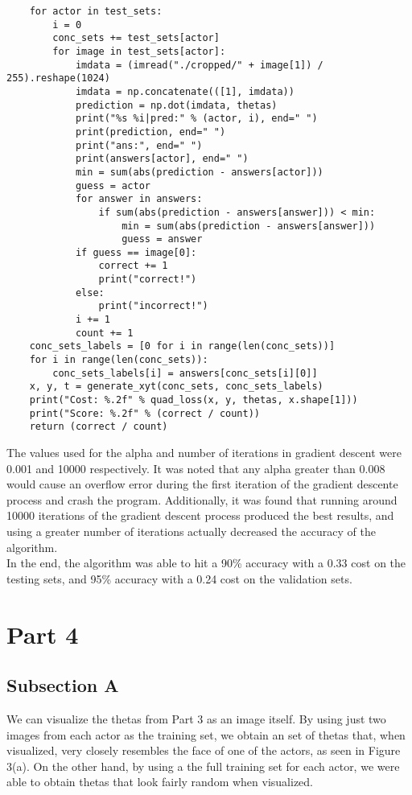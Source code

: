\documentclass[11pt,a4paper]{report}
\begin{document}
\begin{enumerate}
\begin{lstlisting}
    for actor in test_sets:
        i = 0
        conc_sets += test_sets[actor]
        for image in test_sets[actor]:
            imdata = (imread("./cropped/" + image[1]) / 255).reshape(1024)
            imdata = np.concatenate(([1], imdata))
            prediction = np.dot(imdata, thetas)
            print("%s %i|pred:" % (actor, i), end=" ")
            print(prediction, end=" ")
            print("ans:", end=" ")
            print(answers[actor], end=" ")
            min = sum(abs(prediction - answers[actor]))
            guess = actor
            for answer in answers:
                if sum(abs(prediction - answers[answer])) < min:
                    min = sum(abs(prediction - answers[answer]))
                    guess = answer
            if guess == image[0]:
                correct += 1
                print("correct!")
            else:
                print("incorrect!")
            i += 1
            count += 1
    conc_sets_labels = [0 for i in range(len(conc_sets))]
    for i in range(len(conc_sets)):
        conc_sets_labels[i] = answers[conc_sets[i][0]]
    x, y, t = generate_xyt(conc_sets, conc_sets_labels)
    print("Cost: %.2f" % quad_loss(x, y, thetas, x.shape[1]))
    print("Score: %.2f" % (correct / count))
    return (correct / count)
\end{lstlisting}
\end{enumerate}

The values used for the alpha and number of iterations in gradient descent were 0.001 and 10000 respectively. It was noted that any alpha greater than 0.008 would cause an overflow error during the first iteration of the gradient descente process and crash the program. Additionally, it was found that running around 10000 iterations of the gradient descent process produced the best results, and using a greater number of iterations actually decreased the accuracy of the algorithm.\\

In the end, the algorithm was able to hit a 90\% accuracy with a 0.33 cost on the testing sets, and 95\% accuracy with a 0.24 cost on the validation sets.

\section*{Part 4}
\subsection*{Subsection A}
We can visualize the thetas from Part 3 as an image itself. By using just two images from each actor as the training set, we obtain an set of thetas that, when visualized, very closely resembles the face of one of the actors, as seen in Figure 3(a). On the other hand, by using a the full training set for each actor, we were able to obtain thetas that look fairly random when visualized.
\end{document}
